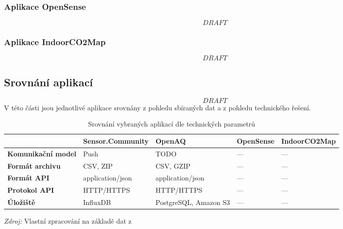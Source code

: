 \subsubsection{Aplikace OpenSense}

\[DRAFT\]

\subsubsection{Aplikace IndoorCO2Map}

\[DRAFT\]


\subsection{Srovnání aplikací}

\[DRAFT\]
V této části jsou jednotlivé aplikace srovnány z pohledu sbíraných dat a z pohledu technického řešení.

\begin{table}[!tbp]
  \centering
  \footnotesize
  \setlength{\tabcolsep}{2pt}
  \renewcommand{\arraystretch}{1.1}
  \caption{Srovnání vybraných aplikací dle technických parametrů}
  \label{tab05:aplikace-srovnani-technicke}
    \begin{tabular}{p{2.6cm}p{3.3cm}p{2.5cm}p{2.25cm}p{2.6cm}}
    \toprule
     & \textbf{Sensor.Community} & \textbf{OpenAQ} & \textbf{OpenSense} & \textbf{IndoorCO2Map}\\
    \midrule
      \textbf{Komunikační model} & Push & TODO & --- & ---\\
    \midrule
      \textbf{Formát archivu} & CSV, ZIP & CSV, GZIP & --- & ---\\
    \midrule
      \textbf{Formát API} & application/json & application/json& --- & ---\\
    \midrule
      \textbf{Protokol API} & HTTP/HTTPS & HTTP/HTTPS & --- & ---\\
    \midrule
      \textbf{Úložiště} & InfluxDB & PostgreSQL, Amazon S3 & --- & ---\\
    \bottomrule
  \end{tabular}

  \footnotesize \textit{Zdroj:} Vlastní zpracování na základě dat z \parencite{Index, APIs, API, zotero-item-552, OpenaqOpenaqapiv22026}
\end{table}

